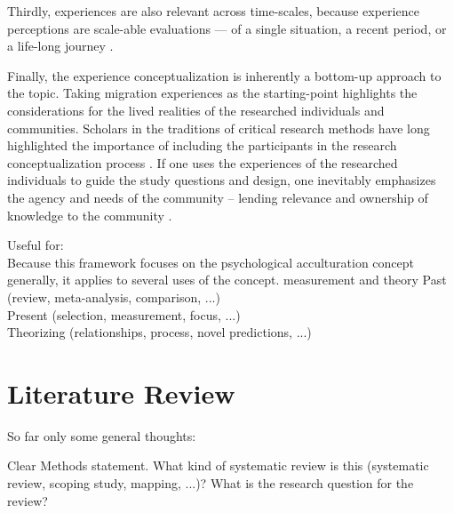 \documentclass[nobib]{tufte-handout}
\begin{document}
Thirdly, experiences are also relevant across time-scales, because experience perceptions are scale-able evaluations --- of a single situation, a recent period, or a life-long journey \citep[e.g.,][]{Clewett2019}.

Finally, the experience conceptualization is inherently a bottom-up approach to the topic. Taking migration experiences as the starting-point highlights the considerations for the lived realities of the researched individuals and communities. Scholars in the traditions of critical research methods have long highlighted the importance of including the participants in the research conceptualization process \citep[e.g.,][]{Kovach2009}. If one uses the experiences of the researched individuals to guide the study questions and design, one inevitably emphasizes the agency and needs of the community -- lending relevance and ownership of knowledge to the community \citep[e.g., ][]{Schmidt2021}.

 Useful for:\\
Because this framework focuses on the psychological acculturation concept generally, it applies to several uses of the concept. measurement and theory
Past (review, meta-analysis, comparison, ...)\\
Present (selection, measurement, focus, ...)\\
Theorizing (relationships, process, novel predictions, ...)

\section{Literature Review}

So far only some general thoughts:

Clear Methods statement. What kind of systematic review is this (systematic review, scoping study, mapping, ...)? What is the research question for the review?
\end{document}
